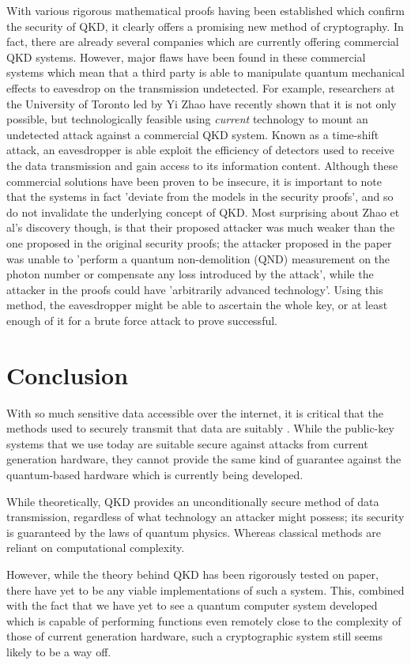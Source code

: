 \documentclass[runningheads,a4paper]{llncs}
\begin{document}
With various rigorous mathematical proofs having been established which confirm the security of QKD\cite{Deutsch:1996fk}\cite{Shor:2000uq}, it clearly offers a promising new method of cryptography. In fact, there are already several companies which are currently offering commercial QKD systems. However, major flaws have been found in these commercial systems which mean that a third party is able to manipulate quantum mechanical effects to eavesdrop on the transmission undetected\cite{Wiechers:2011fk}\cite{Zhao:2008fk}. For example, researchers at the University of Toronto led by Yi Zhao have recently shown that it is not only possible, but technologically feasible using \emph{current} technology to mount an undetected attack against a commercial QKD system. Known as a time-shift attack, an eavesdropper is able exploit the efficiency of detectors used to receive the data transmission and gain access to its information content. Although these commercial solutions have been proven to be insecure, it is important to note that the systems in fact 'deviate from the models in the security proofs'\cite{Lydersen:2010qy}, and so do not invalidate the underlying concept of QKD. Most surprising about Zhao et al's discovery though, is that their proposed attacker was much weaker than the one proposed in the original security proofs; the attacker proposed in the paper was unable to 'perform a quantum non-demolition (QND) measurement on the photon number or compensate any loss introduced by the attack', while the attacker in the proofs could have 'arbitrarily advanced technology'. Using this method, the eavesdropper might be able to ascertain the whole key, or at least enough of it for a brute force attack to prove successful. 

\section{Conclusion}

With so much sensitive data accessible over the internet, it is critical that the methods used to securely transmit that data are suitably . While the public-key systems that we use today are suitable secure against attacks from current generation hardware, they cannot provide the same kind of guarantee against the quantum-based hardware which is currently being developed.

While theoretically, QKD provides an unconditionally secure method of data transmission, regardless of what technology an attacker might possess; its security is guaranteed by the laws of quantum physics. Whereas classical methods are reliant on computational complexity.

However, while the theory behind QKD has been rigorously tested on paper, there have yet to be any viable implementations of such a system. This, combined with the fact that we have yet to see a quantum computer system developed which is capable of performing functions even remotely close to the complexity of those of current generation hardware, such a cryptographic system still seems likely to be a way off.



\end{document}

